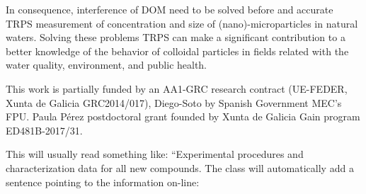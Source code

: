 \documentclass[journal=langd5,manuscript=article]{achemso}
\begin{document}


In consequence, interference of DOM need to be solved before and accurate TRPS measurement of concentration and size of (nano)-microparticles in natural waters. Solving these problems TRPS can make a significant contribution 
to a better knowledge of the behavior of colloidal particles in fields related with the water quality, environment, and public health.




\begin{acknowledgement}

This
work is partially funded by an AA1-GRC research contract (UE-FEDER,
Xunta de Galicia GRC2014/017), Diego-Soto by Spanish Government MEC’s FPU.
Paula Pérez postdoctoral grant founded by Xunta de Galicia Gain program ED481B-2017/31.

\end{acknowledgement}


\begin{suppinfo}

This will usually read something like: ``Experimental procedures and
characterization data for all new compounds. The class will
automatically add a sentence pointing to the information on-line:

\end{suppinfo}


\end{document}
